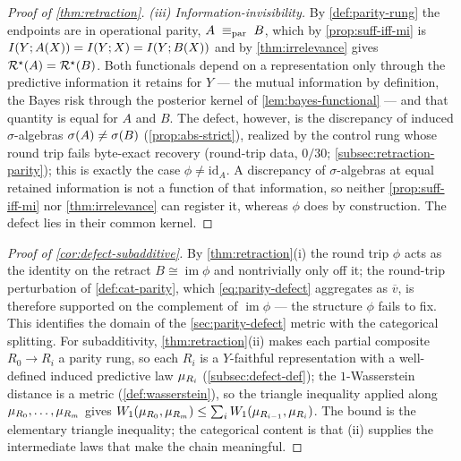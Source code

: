 \begin{proof}[Proof of \cref{thm:retraction}]
\emph{(iii) Information-invisibility.} By \cref{def:parity-rung} the endpoints
are in operational parity, $A\;\equiv_{\mathrm{par}}\; B$, which by \cref{prop:suff-iff-mi} is
$I(Y ; A(X))=I(Y ; X)=I(Y ; B(X))$ and by \cref{thm:irrelevance} gives
$\mathcal{R}^{\star}(A)=\mathcal{R}^{\star}(B)$. Both functionals depend on a representation only
through the predictive information it retains for $Y$ --- the mutual information
by definition, the Bayes risk through the posterior kernel of
\cref{lem:bayes-functional} --- and that quantity is equal for $A$ and $B$. The
defect, however, is the discrepancy of induced $\sigma$-algebras
$\sigma\!\left(A\right)\ne\sigma\!\left(B\right)$ (\cref{prop:abs-strict}), realized by the control rung
whose round trip fails byte-exact recovery (round-trip data, $0/30$;
\cref{subsec:retraction-parity}); this is exactly the case $\phi\ne\mathrm{id}_A$.
A discrepancy of $\sigma$-algebras at equal retained information is not a
function of that information, so neither \cref{prop:suff-iff-mi} nor
\cref{thm:irrelevance} can register it, whereas $\phi$ does by construction. The
defect lies in their common kernel.
\end{proof}

\begin{proof}[Proof of \cref{cor:defect-subadditive}]
By \cref{thm:retraction}(i) the round trip $\phi$ acts as the identity on the
retract $B\cong\operatorname{im}\phi$ and nontrivially only off it; the
round-trip perturbation of \cref{def:cat-parity}, which
\eqref{eq:parity-defect} aggregates as $\overline{v}$, is therefore supported on
the complement of $\operatorname{im}\phi$ --- the structure $\phi$ fails to fix.
This identifies the domain of the \cref{sec:parity-defect} metric with the
categorical splitting. For subadditivity, \cref{thm:retraction}(ii) makes each
partial composite $R_0\to R_i$ a parity rung, so each $R_i$ is a $Y$-faithful
representation with a well-defined induced predictive law $\mu_{R_i}$
(\cref{subsec:defect-def}); the $1$-Wasserstein distance is a metric
(\cref{def:wasserstein}), so the triangle inequality applied along
$\mu_{R_0},\dots,\mu_{R_m}$ gives
$W_{1}(\mu_{R_0},\mu_{R_m})\le\sum_{i}W_{1}(\mu_{R_{i-1}},\mu_{R_i})$.
The bound is the elementary triangle inequality; the categorical content is that
(ii) supplies the intermediate laws that make the chain meaningful.
\end{proof}

